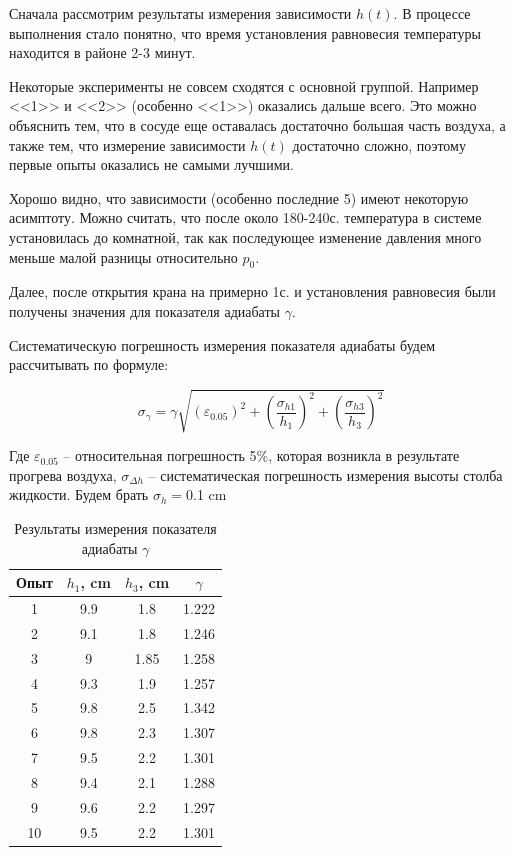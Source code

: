 \documentclass[a4paper,12pt]{report}
\begin{document}
    \begin{multicols}{2}
    Сначала рассмотрим результаты измерения зависимости $h(t)$. В процессе выполнения стало понятно, что время установления равновесия температуры находится в районе 2-3 минут.

    Некоторые эксперименты не совсем сходятся с основной группой. Например <<1>> и <<2>> (особенно <<1>>) оказались дальше всего. Это можно объяснить тем, что в сосуде еще оставалась достаточно большая часть воздуха, а также тем, что измерение зависимости $h(t)$ достаточно сложно, поэтому первые опыты оказались не самыми лучшими.
    
    Хорошо видно, что зависимости (особенно последние 5) имеют некоторую асимптоту. Можно считать, что после около 180-240с. температура в системе установилась до комнатной, так как последующее изменение давления много меньше малой разницы относительно $p_0$.

    Далее, после открытия крана на примерно 1с. и установления равновесия были получены значения для показателя адиабаты $\gamma$.

    Систематическую погрешность измерения показателя адиабаты будем рассчитывать по формуле:

    \begin{equation}
        \label{sigma gamma}
        \sigma_\gamma=\gamma\sqrt{\left(\varepsilon_{0.05}\right)^2+\left(\frac{\sigma_{h1}}{h_1}\right)^2+\left(\frac{\sigma_{{h3}}}{h_3}\right)^2}
    \end{equation}

    Где $\varepsilon_{0.05}$ -- относительная погрешность 5\%, которая возникла в результате прогрева воздуха, $\sigma_{\Delta h}$ -- систематическая погрешность измерения высоты столба жидкости. Будем брать $\sigma_{h}=$0.1 cm

    \begin{table}[H]
        \centering
        \begin{tabular}{|c|c|c|c|}
            \hline
            Опыт & $h_1$, cm & $h_3$, cm & $\gamma$ \\
            \hline
            1 & 9.9 & 1.8 & 1.222 \\
            \hline
            2 & 9.1 & 1.8 & 1.246 \\
            \hline
            3 & 9 & 1.85 & 1.258 \\
            \hline
            4 & 9.3 & 1.9 & 1.257 \\
            \hline
            5 & 9.8 & 2.5 & 1.342 \\
            \hline
            6 & 9.8 & 2.3 & 1.307 \\
            \hline
            7 & 9.5 & 2.2 & 1.301 \\
            \hline
            8 & 9.4 & 2.1 & 1.288 \\
            \hline
            9 & 9.6 & 2.2 & 1.297 \\
            \hline
            10 & 9.5 & 2.2 & 1.301 \\
            \hline
        \end{tabular}
        \caption{Результаты измерения показателя адиабаты $\gamma$}
    \end{table}


\end{multicols}
\end{document}
